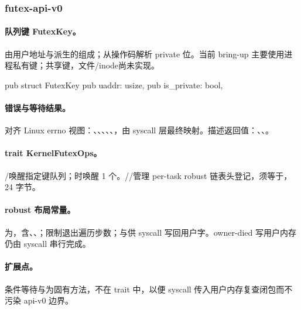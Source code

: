 
\subsubsection{futex-api-v0}

\paragraph{队列键 FutexKey。}
由用户地址与派生的组成；从操作码解析 private 位。当前 bring-up 主要使用进程私有键；共享键，文件/inode尚未实现。

\begin{rustcode}
pub struct FutexKey {
    pub uaddr: usize,
    pub is_private: bool,
}
\end{rustcode}

\paragraph{错误与等待结果。}
对齐 Linux errno 视图：、、、、、，由 syscall 层最终映射。描述返回值：、、。

\paragraph{trait KernelFutexOps。}
/唤醒指定键队列；时唤醒 1 个。//管理 per-task robust 链表头登记，须等于，24 字节。

\paragraph{robust 布局常量。}
为，含、、；限制退出遍历步数；与供 syscall 写回用户字。owner-died 写用户内存仍由 syscall 串行完成。

\paragraph{扩展点。}
条件等待与为固有方法，不在 trait 中，以便 syscall 传入用户内存复查闭包而不污染 api-v0 边界。
